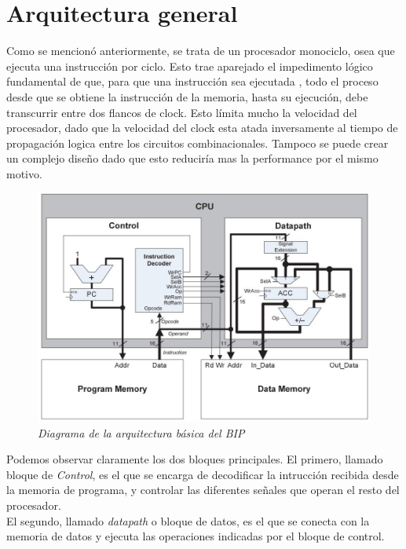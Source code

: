 \documentclass{article}
\begin{document}
\section{Arquitectura general}
\indent Como se mencionó anteriormente, se trata de un procesador monociclo,
osea que ejecuta una instrucción por ciclo. Esto trae aparejado el impedimento lógico fundamental de que,
para que una instrucción sea ejecutada , todo el proceso desde que se obtiene la instrucción de la memoria,
hasta su ejecución, debe transcurrir entre dos flancos de clock. Esto límita mucho la velocidad del procesador,
dado que la velocidad del clock esta atada inversamente al tiempo de propagación logica entre los circuitos combinacionales.
Tampoco se puede crear un complejo diseño dado que esto reduciría mas la performance por el mismo motivo.

\begin{figure}[H]
    \includegraphics[scale=0.5]{bip_arch}
    \caption{\textit{Diagrama de la arquitectura básica del BIP}}
\end{figure}

Podemos observar claramente los dos bloques principales.
\indent El primero, llamado bloque de \textit{Control}, es el que se encarga de decodificar
la intrucción recibida desde la memoria de programa, y controlar las diferentes señales que operan el resto
del procesador. \\
\indent El segundo, llamado \textit{datapath} o bloque de datos, es el que se conecta con la memoria de datos y ejecuta las operaciones indicadas por el bloque de control. \\ \\
\end{document}
